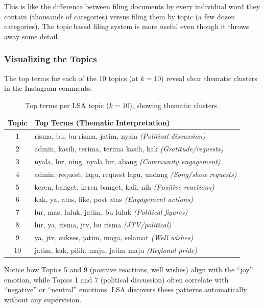 \documentclass[12pt,a4paper,twoside]{article}
\theoremstyle{definition}
\begin{document}
This is like the difference between filing documents by every individual word they contain (thousands of categories) versus filing them by topic (a few dozen categories). The topic\,based filing system is more useful even though it throws away some detail.
 
\subsubsection{Visualizing the Topics}
 
The top terms for each of the 10 topics (at $k=10$) reveal clear thematic clusters in the Instagram comments:
 
\begin{table}[h]
\centering
\caption{Top terms per LSA topic ($k=10$), showing thematic clusters.}
\label{tab:topics}
\small
\begin{tabular}{cl}
\toprule
\textbf{Topic} & \textbf{Top Terms (Thematic Interpretation)} \\
\midrule
1 & risma, bu, bu risma, jatim, nyala \textit{(Political discussion)} \\
2 & admin, kasih, terima, terima kasih, kak \textit{(Gratitude/requests)} \\
3 & nyala, lur, ning, nyala lur, abang \textit{(Community engagement)} \\
4 & admin, request, lagu, request lagu, undang \textit{(Song/show requests)} \\
5 & keren, banget, keren banget, kali, nih \textit{(Positive reactions)} \\
6 & kak, ya, atas, like, post atas \textit{(Engagement actions)} \\
7 & lur, mas, luluk, jatim, bu luluk \textit{(Political figures)} \\
8 & lur, ya, risma, jtv, bu risma \textit{(JTV/political)} \\
9 & ya, jtv, sukses, jatim, moga, selamat \textit{(Well wishes)} \\
10 & jatim, kak, pilih, maju, jatim maju \textit{(Regional pride)} \\
\bottomrule
\end{tabular}
\end{table}
 
Notice how Topics 5 and 9 (positive reactions, well wishes) align with the ``joy'' emotion, while Topics 1 and 7 (political discussion) often correlate with ``negative'' or ``neutral'' emotions. LSA discovers these patterns automatically without any supervision.
\end{document}

